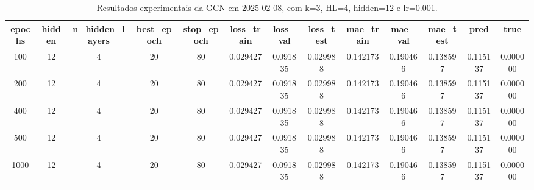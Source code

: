 \begin{table}[h]
\centering
\caption{Resultados experimentais da GCN em 2025-02-08, com k=3, HL=4, hidden=12 e lr=0.001.}
\label{tab:gcn_results_k3_hl4_h12_d20250208}
\begin{tabular}{ccccccccccccc}
\toprule
epochs & hidden & n\_hidden\_layers & best\_epoch & stop\_epoch & loss\_train & loss\_val & loss\_test & mae\_train & mae\_val & mae\_test & pred & true \\
\midrule
100 & 12 & 4 & 20 & 80 & 0.029427 & 0.091835 & 0.029988 & 0.142173 & 0.190466 & 0.138597 & 0.115137 & 0.000000 \\
200 & 12 & 4 & 20 & 80 & 0.029427 & 0.091835 & 0.029988 & 0.142173 & 0.190466 & 0.138597 & 0.115137 & 0.000000 \\
400 & 12 & 4 & 20 & 80 & 0.029427 & 0.091835 & 0.029988 & 0.142173 & 0.190466 & 0.138597 & 0.115137 & 0.000000 \\
500 & 12 & 4 & 20 & 80 & 0.029427 & 0.091835 & 0.029988 & 0.142173 & 0.190466 & 0.138597 & 0.115137 & 0.000000 \\
1000 & 12 & 4 & 20 & 80 & 0.029427 & 0.091835 & 0.029988 & 0.142173 & 0.190466 & 0.138597 & 0.115137 & 0.000000 \\
\bottomrule
\end{tabular}
\end{table}
